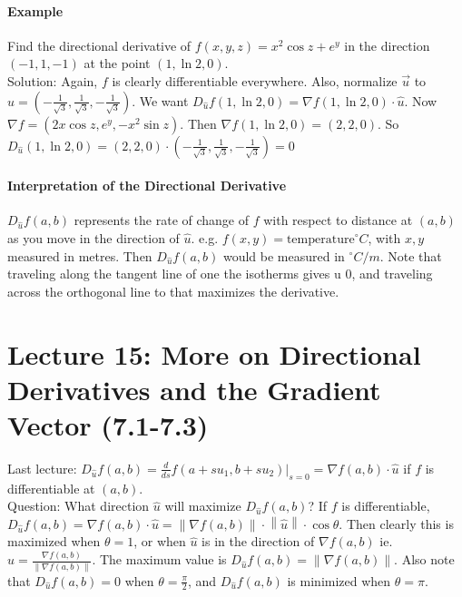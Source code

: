 \documentclass[tikz,10pt,letter]{article}
\theoremstyle{plain}
\theoremstyle{definition}
\newcommand{\norm}[1]{\left\lVert#1\right\rVert}
\begin{document}
\paragraph{Example}
Find the directional derivative of $f(x,y,z)=x^2\cos z+e^y$ in the direction $(-1,1,-1)$ at the point $(1,\ln2,0)$. \\ 
Solution: Again, $f$ is clearly differentiable everywhere. Also, normalize $\vec{u}$ to $\hat{u}=\left(-\frac{1}{\sqrt{3}},\frac{1}{\sqrt{3}},-\frac{1}{\sqrt{3}}\right)$. We want $D_{\hat{u}}f(1,\ln2,0)=\nabla f(1,\ln2,0)\cdot\hat{u}$. Now $\nabla f=(2x\cos z,e^y, -x^2\sin z)$. Then $\nabla f(1,\ln2,0)=(2,2,0)$. So $D_{\hat{u}}(1,\ln2,0)=(2,2,0)\cdot\left(-\frac{1}{\sqrt{3}},\frac{1}{\sqrt{3}},-\frac{1}{\sqrt{3}}\right)=0$
\paragraph{Interpretation of the Directional Derivative}
$D_{\hat{u}}f(a,b)$ represents the rate of change of $f$ with respect to distance at $(a,b)$ as you move in the direction of $\hat{u}$. e.g. $f(x,y)=\text{temperature}^\circ C$, with $x,y$ measured in metres. Then $D_{\hat{u}}f(a,b)$ would be measured in $^\circ C/m$. Note that traveling along the tangent line of one the isotherms gives u 0, and traveling across the orthogonal line to that maximizes the derivative.

\section*{Lecture 15: More on Directional Derivatives and the Gradient Vector (7.1-7.3)}
Last lecture: $D_{\hat{u}}f(a,b)=\frac{d}{ds}f(a+su_1,b+su_2)|_{s=0}=\nabla f(a,b)\cdot\hat{u}$ if $f$ is differentiable at $(a,b)$. \\ 
Question: What direction $\hat{u}$ will maximize $D_{\hat{u}}f(a,b)$? If $f$ is differentiable, $D_{\hat{u}}f(a,b)=\nabla f(a,b)\cdot\hat{u}=\norm{\nabla f(a,b)}\cdot\norm{\hat{u}}\cdot\cos\theta$. Then clearly this is maximized when $\theta=1$, or when $\hat{u}$ is in the direction of $\nabla f(a,b)$ ie. $\hat{u}=\frac{\nabla f(a,b)}{\norm{\nabla f(a,b)}}$. The maximum value is $D_{\hat{u}}f(a,b)=\norm{\nabla f(a,b)}$. Also note that $D_{\hat{u}}f(a,b)=0$ when $\theta=\frac{\pi}{2}$, and $D_{\hat{u}}f(a,b)$ is minimized when $\theta=\pi$. 
\end{document}
